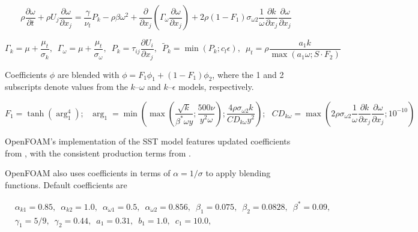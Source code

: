 \begin{equation}
    \rho \frac{\partial \omega}{\partial t}
    + \rho U_j \frac{\partial \omega}{\partial x_j}
    = \frac{\gamma}{\nu_t} P_k - \rho \beta \omega^2
    + \frac{\partial}{\partial x_j}
    \left(
    \Gamma_\omega \frac{\partial \omega}{\partial x_j}
    \right)
    + 2 \rho (1 - F_1) \sigma_{\omega 2}
    \frac{1}{\omega} \frac{\partial k}{\partial x_j}
    \frac{\partial \omega}{\partial x_j}
\end{equation}

\begin{equation}
    \Gamma_k = \mu + \frac{\mu_t}{\sigma_k}, \, \, \,
    \Gamma_\omega = \mu + \frac{\mu_t}{\sigma_\omega}, \, \, \,
    P_k = \tau_{ij} \frac{\partial U_i}{\partial x_j}, \, \, \,
    \tilde{P}_k = \min(P_k;c_l \epsilon), \, \, \,
    \mu_t = \rho \frac{a_1 k}{\max(a_1 \omega; S \cdot F_2)}
\end{equation}

Coefficients $\phi$ are blended with $\phi = F_1 \phi_1 + (1 - F_1) \phi_2$,
where the 1 and 2 subscripts denote values from the $k$--$\omega$ and
$k$--$\epsilon$ models, respectively.

\begin{equation}
    F_1 = \tanh (\arg_1^4); \, \, \, \,
    \arg_1 = \min
    \left(
    \max
    \left(
    \frac{\sqrt{k}}{\beta^* \omega y};
    \frac{500 \nu}{y^2 \omega}
    \right);
    \frac{4 \rho \sigma_{\omega2} k}{CD_{k \omega} y^2}
    \right); \, \, \, \,
    CD_{k \omega} = \max
    \left(
    2 \rho \sigma_{\omega 2} \frac{1}{\omega}
    \frac{\partial k}{\partial x_j}
    \frac{\partial \omega}{\partial x_j};
    10^{-10}
    \right)
\end{equation}

OpenFOAM's implementation of the SST model features updated coefficients from
\cite{Menter2003}, with the consistent production terms from \cite{Menter2001}.

OpenFOAM also uses coefficients in terms of $\alpha = 1/\sigma$ to apply
blending functions. Default coefficients are

\begin{equation}
\begin{split}
&   \alpha_{k1} = 0.85, \, \, \,
    \alpha_{k2} = 1.0, \, \, \,
    \alpha_{\omega1} = 0.5, \, \, \,
    \alpha_{\omega2} = 0.856, \, \, \,
    \beta_1 = 0.075, \, \, \,
    \beta_2 = 0.0828, \, \, \,
    \beta^* = 0.09, \, \, \, \\
&   \gamma_1 = 5/9, \, \, \,
    \gamma_2 = 0.44, \, \, \,
    a_1 = 0.31, \, \, \,
    b_1 = 1.0, \, \, \,
    c_1 = 10.0, \, \, \,
\end{split}
\end{equation}



